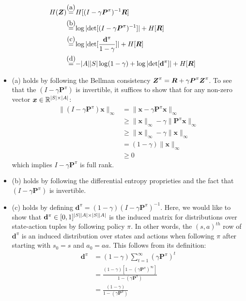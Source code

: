 \documentclass{article}
\newcommand{\state}{s}
\newcommand{\action}{a}
\newcommand{\reward}{r}
\begin{document}
\begin{align*}
    H(\boldsymbol{Z})& \stackrel{\mathclap{\normalfont\mbox{(a)}}}{=}H[(I-\gamma \boldsymbol{P}^{\pi})^{-1}\boldsymbol{\MakeUppercase{\reward}}]\\
    & \stackrel{\mathclap{\normalfont\mbox{(b)}}}{=}\log|\text{det}[(I-\gamma \boldsymbol{P}^{\pi})^{-1}]|+H[\boldsymbol{\MakeUppercase{\reward}}] \\
    & \stackrel{\mathclap{\normalfont\mbox{(c)}}}{=}\log|\text{det}[\frac{\mathbf{d}^{\pi}}{1-\gamma}]|+H[\boldsymbol{\MakeUppercase{\reward}}]\\
    & \stackrel{\mathclap{\normalfont\mbox{(d)}}}{=}-|A||S|\log(1-\gamma)+\log|\text{det}[\mathbf{d}^{\pi}]|+H[\boldsymbol{\MakeUppercase{\reward}}]
\end{align*}

\begin{itemize}
    \item (a) holds by following the Bellman consistency $\boldsymbol{Z}^{\pi}=\boldsymbol{\MakeUppercase{\reward}}+\gamma \boldsymbol{P}^{\pi} \boldsymbol{Z}^{\pi}$. To see that the $(I-\gamma \boldsymbol{P}^{\pi})$ is invertible, it suffices to show that for any non-zero vector $\boldsymbol{x}\in \mathbb{R}^{|\MakeUppercase{\state}|\times|\MakeUppercase{\action}|}$:
    \begin{align*}
        \|(I-\gamma \boldsymbol{P}^{\pi})\boldsymbol{x}\|_{\infty}&=\|\boldsymbol{x}-\gamma \boldsymbol{P}^{\pi}\boldsymbol{x}\|_{\infty}\\
        & \geq \|\boldsymbol{x}\|_{\infty}-\gamma \|\boldsymbol{P}^{\pi}\boldsymbol{x}\|_{\infty}\\
        & \geq \|\boldsymbol{x}\|_{\infty}-\gamma \|\boldsymbol{x}\|_{\infty}\\
        & = (1-\gamma)\|\boldsymbol{x}\|_{\infty}\\
        & \geq 0
    \end{align*}
    which implies $I-\gamma \boldsymbol{P}^{\pi}$ is full rank.
    \item (b) holds by following the differential entropy proprieties and the fact that $(I-\gamma \boldsymbol{P}^{\pi})$ is invertible.
    \item (c) holds by defining $\mathbf{d}^{\pi}=(1-\gamma)(I-\gamma \boldsymbol{P}^{\pi})^{-1}$. Here, we would like to show that $\mathbf{d}^{\pi}\in[0,1]^{|\MakeUppercase{\state}||\MakeUppercase{\action}|\times|\MakeUppercase{\state}||\MakeUppercase{\action}|}$ is the induced matrix for distributions over state-action tuples by following policy $\pi$. In other words, the $(\state,\action)^{th}$ row of $\mathbf{d}^{\pi}$ is an induced distribution over states and actions when following $\pi$ after starting with $\state_{0} = \state$ and $\action_{0} = a\action$. This follows from its definition: 
    \begin{align}
        \mathbf{d}^{\pi} & = (1-\gamma) \sum_{t=1}^{\infty}(\gamma\boldsymbol{P}^{\pi})^{t}\\
        & = \frac{(1-\gamma)[1-(\gamma\boldsymbol{P}^{\pi})^{\infty}]}{1-(\gamma\boldsymbol{P}^{\pi})} \\
        & = \frac{(1-\gamma)}{1-(\gamma\boldsymbol{P}^{\pi})}
    \end{align}


\end{itemize}
\end{document}
